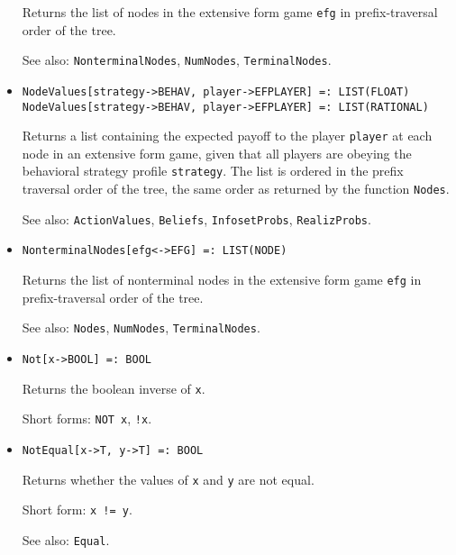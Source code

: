 \begin{itemize}
\bd
Returns the list of nodes in the extensive form game
\verb+efg+ in prefix-traversal order of the tree.
\item
[See also:] {\tt NonterminalNodes}, {\tt NumNodes}, {\tt TerminalNodes}.
\ed

\item
\protect \large \begin{verbatim}
NodeValues[strategy->BEHAV, player->EFPLAYER] =: LIST(FLOAT)
NodeValues[strategy->BEHAV, player->EFPLAYER] =: LIST(RATIONAL)
\end{verbatim}\normalsize

\bd
Returns a list containing the expected payoff to the player \verb+player+
at each node in an extensive form game, given that all players are obeying
the behavioral strategy profile \verb+strategy+.  The list is ordered
in the prefix traversal order of the tree, the same order as returned
by the function {\tt Nodes}.
\item
[See also:] {\tt ActionValues}, {\tt Beliefs}, {\tt InfosetProbs},
{\tt RealizProbs}.
\ed

\item
\protect \large \begin{verbatim} 
NonterminalNodes[efg<->EFG] =: LIST(NODE)
\end{verbatim}\normalsize

\bd
Returns the list of nonterminal nodes in the extensive form
game \verb+efg+ in prefix-traversal order of the tree.
\item
[See also:] {\tt Nodes}, {\tt NumNodes}, {\tt TerminalNodes}.
\ed

\item
\protect \large \begin{verbatim}
Not[x->BOOL] =: BOOL
\end{verbatim}\normalsize

\bd
Returns the boolean inverse of \verb+x+.
\item
[Short forms:] \verb+NOT x+, \verb+!x+.
\ed

\item
\protect \large \begin{verbatim}
NotEqual[x->T, y->T] =: BOOL
\end{verbatim}\normalsize

\bd
Returns whether the values of \verb+x+ and \verb+y+ are
not equal.
\item
[Short form:] \verb+x != y+.
\item
[See also:] {\tt Equal}.
\ed


\end{itemize}
